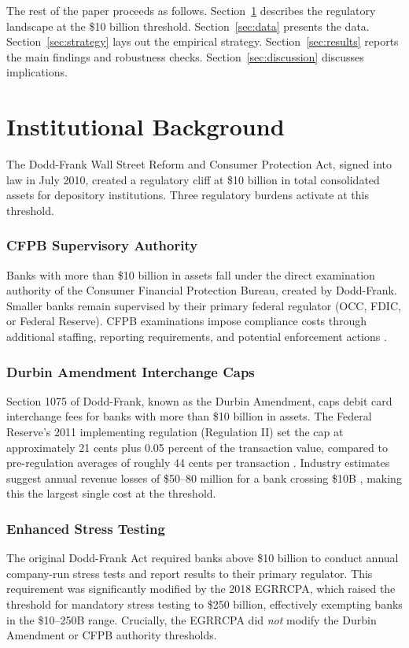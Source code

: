 \documentclass[12pt]{article}
\begin{document}
The rest of the paper proceeds as follows. Section~\ref{sec:background} describes the regulatory landscape at the \$10 billion threshold. Section~\ref{sec:data} presents the data. Section~\ref{sec:strategy} lays out the empirical strategy. Section~\ref{sec:results} reports the main findings and robustness checks. Section~\ref{sec:discussion} discusses implications.

\section{Institutional Background}
\label{sec:background}

The Dodd-Frank Wall Street Reform and Consumer Protection Act, signed into law in July 2010, created a regulatory cliff at \$10 billion in total consolidated assets for depository institutions. Three regulatory burdens activate at this threshold.

\subsubsection*{CFPB Supervisory Authority} Banks with more than \$10 billion in assets fall under the direct examination authority of the Consumer Financial Protection Bureau, created by Dodd-Frank. Smaller banks remain supervised by their primary federal regulator (OCC, FDIC, or Federal Reserve). CFPB examinations impose compliance costs through additional staffing, reporting requirements, and potential enforcement actions \citep{Agarwal2014}.

\subsubsection*{Durbin Amendment Interchange Caps} Section 1075 of Dodd-Frank, known as the Durbin Amendment, caps debit card interchange fees for banks with more than \$10 billion in assets. The Federal Reserve's 2011 implementing regulation (Regulation II) set the cap at approximately 21 cents plus 0.05 percent of the transaction value, compared to pre-regulation averages of roughly 44 cents per transaction \citep{Hayashi2012}. Industry estimates suggest annual revenue losses of \$50--80 million for a bank crossing \$10B \citep{Kay2023}, making this the largest single cost at the threshold.

\subsubsection*{Enhanced Stress Testing} The original Dodd-Frank Act required banks above \$10 billion to conduct annual company-run stress tests and report results to their primary regulator. This requirement was significantly modified by the 2018 EGRRCPA, which raised the threshold for mandatory stress testing to \$250 billion, effectively exempting banks in the \$10--250B range. Crucially, the EGRRCPA did \textit{not} modify the Durbin Amendment or CFPB authority thresholds.
\end{document}
